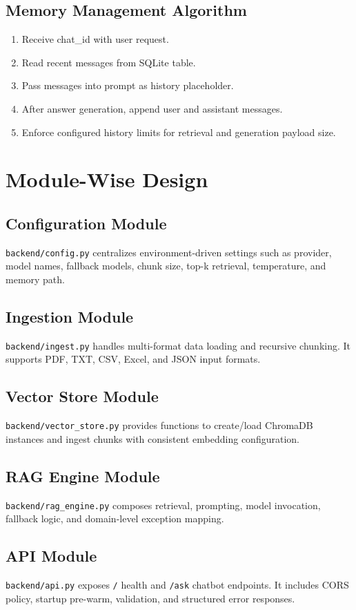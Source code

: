 \documentclass[12pt,letterpaper]{report}
\begin{document}
\subsection{Memory Management Algorithm}
\begin{enumerate}
\item Receive chat\_id with user request.
\item Read recent messages from SQLite table.
\item Pass messages into prompt as history placeholder.
\item After answer generation, append user and assistant messages.
\item Enforce configured history limits for retrieval and generation payload size.
\end{enumerate}

\section{Module-Wise Design}
\subsection{Configuration Module}
\texttt{backend/config.py} centralizes environment-driven settings such as provider, model names, fallback models, chunk size, top-k retrieval, temperature, and memory path.

\subsection{Ingestion Module}
\texttt{backend/ingest.py} handles multi-format data loading and recursive chunking. It supports PDF, TXT, CSV, Excel, and JSON input formats.

\subsection{Vector Store Module}
\texttt{backend/vector\_store.py} provides functions to create/load ChromaDB instances and ingest chunks with consistent embedding configuration.

\subsection{RAG Engine Module}
\texttt{backend/rag\_engine.py} composes retrieval, prompting, model invocation, fallback logic, and domain-level exception mapping.

\subsection{API Module}
\texttt{backend/api.py} exposes \texttt{/} health and \texttt{/ask} chatbot endpoints. It includes CORS policy, startup pre-warm, validation, and structured error responses.
\end{document}
